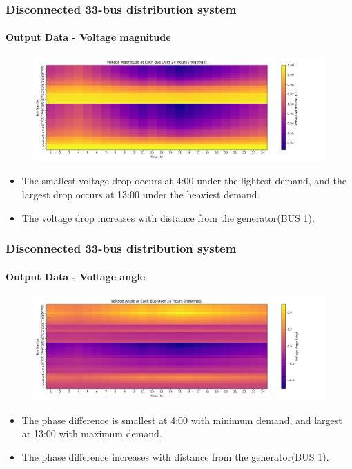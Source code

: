 \documentclass[
	11pt, %
	aspectratio=169, %
]{beamer}
\begin{document}


\begin{frame}
	\frametitle{Disconnected 33-bus distribution system}
	\framesubtitle{Output Data - Voltage magnitude}

	\begin{figure}
		\includegraphics[width=5 in,keepaspectratio]{../fig/V_mag_heatmap.png}
	\end{figure}

	\begin{itemize}
		\item The smallest voltage drop occurs at 4:00 under the lightest demand, and the largest drop occurs at 13:00 under the heaviest demand.
		\item The voltage drop increases with distance from the generator(BUS 1).
	\end{itemize}

	
\end{frame}


\begin{frame}
	\frametitle{Disconnected 33-bus distribution system}
	\framesubtitle{Output Data - Voltage angle}

	\begin{figure}
		\includegraphics[width=5 in,keepaspectratio]{../fig/V_ang_heatmap.png}
	\end{figure}

		\begin{itemize}
		\item The phase difference is smallest at 4:00 with minimum demand, and largest at 13:00 with maximum demand.
		\item The phase difference increases with distance from the generator(BUS 1).
	\end{itemize}

	
\end{frame}
\end{document}
